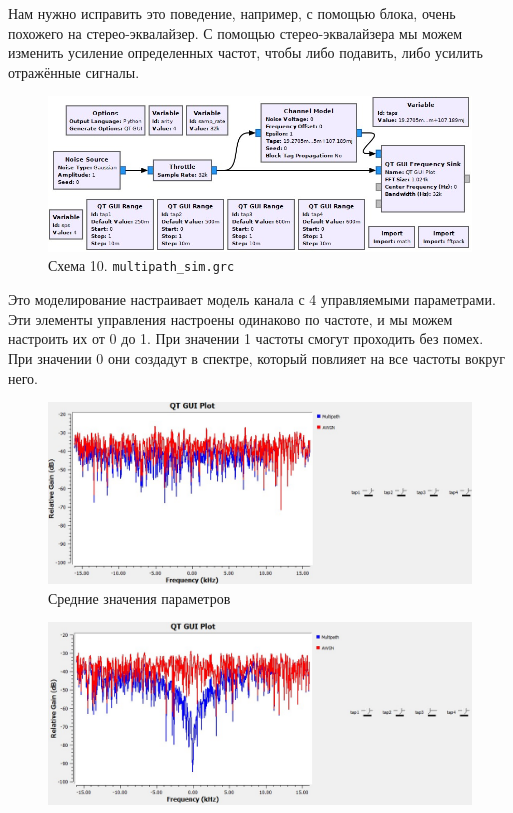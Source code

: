 \documentclass[a4paper, 12pt]{report}
\begin{document}
	Нам нужно исправить это поведение, например, с помощью блока, очень похожего на стерео-эквалайзер. С помощью стерео-эквалайзера мы можем изменить усиление определенных частот, чтобы либо подавить, либо усилить отражённые сигналы.
	\begin{figure}[H]
		\centering
		\includegraphics[width=1.0\textwidth]{24.jpg}
		\caption{Схема 10. \texttt{multipath\_sim.grc}}
		\label{fig:24}
	\end{figure}
	Это моделирование настраивает модель канала с 4  управляемыми параметрами. Эти элементы управления настроены одинаково по частоте, и мы можем настроить их от 0 до 1. При значении 1 частоты смогут проходить без помех. При значении 0 они создадут  в спектре, который повлияет на все частоты вокруг него.
	\begin{figure}[H]
		\centering
		\includegraphics[width=1.0\textwidth]{25.jpg}
		\caption{Средние значения параметров}
		\label{fig:25}
	\end{figure}
	\begin{figure}[H]
		\centering
		\includegraphics[width=1.0\textwidth]{26.jpg}
		\caption{}
		\label{fig:26}
	\end{figure}
\end{document}
